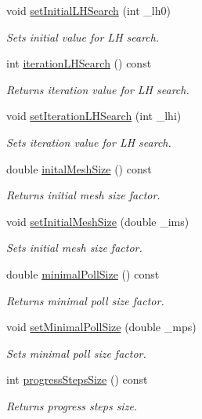 \begin{DoxyCompactItemize}
void \hyperlink{class_c_m_a_d_s_a853551c7d08c15950c881c3add3ced2e}{set\-Initial\-L\-H\-Search} (int \-\_\-lh0)
\begin{DoxyCompactList}\small\item\em Sets initial value for L\-H search. \end{DoxyCompactList}\item 
int \hyperlink{class_c_m_a_d_s_a2e1b3ebc4aabb5ddba0d27b2ef7d69c3}{iteration\-L\-H\-Search} () const 
\begin{DoxyCompactList}\small\item\em Returns iteration value for L\-H search. \end{DoxyCompactList}\item 
void \hyperlink{class_c_m_a_d_s_aa3eb719cc325a85c936ab8a2726823d1}{set\-Iteration\-L\-H\-Search} (int \-\_\-lhi)
\begin{DoxyCompactList}\small\item\em Sets iteration value for L\-H search. \end{DoxyCompactList}\item 
double \hyperlink{class_c_m_a_d_s_a4f7f28c0ef8d53f2fc6c787f2c563ee4}{inital\-Mesh\-Size} () const 
\begin{DoxyCompactList}\small\item\em Returns initial mesh size factor. \end{DoxyCompactList}\item 
void \hyperlink{class_c_m_a_d_s_adaa46855d1352f36c25eaedbeec36e63}{set\-Initial\-Mesh\-Size} (double \-\_\-ims)
\begin{DoxyCompactList}\small\item\em Sets initial mesh size factor. \end{DoxyCompactList}\item 
double \hyperlink{class_c_m_a_d_s_af4c8a983df3b90769230f1e1829af082}{minimal\-Poll\-Size} () const 
\begin{DoxyCompactList}\small\item\em Returns minimal poll size factor. \end{DoxyCompactList}\item 
void \hyperlink{class_c_m_a_d_s_a1580912554dc75226645bc667d5fb1ec}{set\-Minimal\-Poll\-Size} (double \-\_\-mps)
\begin{DoxyCompactList}\small\item\em Sets minimal poll size factor. \end{DoxyCompactList}\item 
int \hyperlink{class_c_m_a_d_s_a1c09eee0705ed297fa20af147e9235bc}{progress\-Steps\-Size} () const 
\begin{DoxyCompactList}\small\item\em Returns progress steps size. \end{DoxyCompactList}\end{DoxyCompactItemize}
